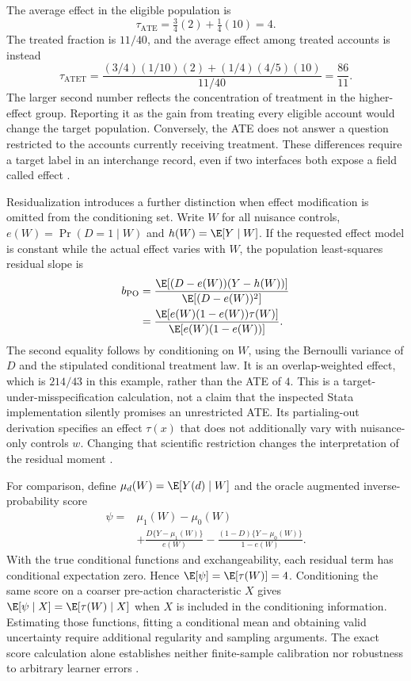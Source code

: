 The average effect in the eligible population is
\[
 \tau_{\mathrm{ATE}}=\tfrac34(2)+\tfrac14(10)=4.
\]
The treated fraction is $11/40$, and the average effect among treated
accounts is instead
\[
 \tau_{\mathrm{ATET}}
 =\frac{(3/4)(1/10)(2)+(1/4)(4/5)(10)}{11/40}
 =\frac{86}{11}.
\]
The larger second number reflects the concentration of treatment in the
higher-effect group. Reporting it as the gain from treating every eligible
account would change the target population. Conversely, the ATE does not
answer a question restricted to the accounts currently receiving treatment.
These differences require a target label in an interchange record, even if
two interfaces both expose a field called effect
\citep{exec13_ch_exact}.

Residualization introduces a further distinction when effect modification
is omitted from the conditioning set. Write $W$ for all nuisance controls,
$e(W)=\Pr(D=1\mid W)$ and $h(W)=\E[Y\mid W]$. If the requested effect
model is constant while the actual effect varies with $W$, the population
least-squares residual slope is
\begin{align*}
 b_{\mathrm{PO}}
 &=\frac{\E[(D-e(W))(Y-h(W))]}{\E[(D-e(W))^2]}\\
 &=\frac{\E[e(W)(1-e(W))\tau(W)]}{\E[e(W)(1-e(W))]}.
\end{align*}
The second equality follows by conditioning on $W$, using the Bernoulli
variance of $D$ and the stipulated conditional treatment law. It is an
overlap-weighted effect, which is $214/43$ in this example, rather than the
ATE of $4$. This is a target-under-misspecification calculation, not a
claim that the inspected Stata implementation silently promises an
unrestricted ATE. Its partialing-out derivation specifies an effect
$\tau(x)$ that does not additionally vary with nuisance-only controls $w$.
Changing that scientific restriction changes the interpretation of the
residual moment \citep{exec13_ch_stata,exec13_ch_exact}.

For comparison, define $\mu_d(W)=\E[Y(d)\mid W]$ and the oracle augmented
inverse-probability score
\begin{align*}
 \psi={}&\mu_1(W)-\mu_0(W)\\
 &+\frac{D\{Y-\mu_1(W)\}}{e(W)}
 -\frac{(1-D)\{Y-\mu_0(W)\}}{1-e(W)}.
\end{align*}
With the true conditional functions and exchangeability, each residual
term has conditional expectation zero. Hence $\E[\psi]=\E[\tau(W)]=4$.
Conditioning the same score on a coarser pre-action characteristic $X$
gives $\E[\psi\mid X]=\E[\tau(W)\mid X]$ when $X$ is included in the
conditioning information. Estimating those functions, fitting a conditional
mean and obtaining valid uncertainty require additional regularity and
sampling arguments. The exact score calculation alone establishes neither
finite-sample calibration nor robustness to arbitrary learner errors
\citep{exec13_ch_exact}.

